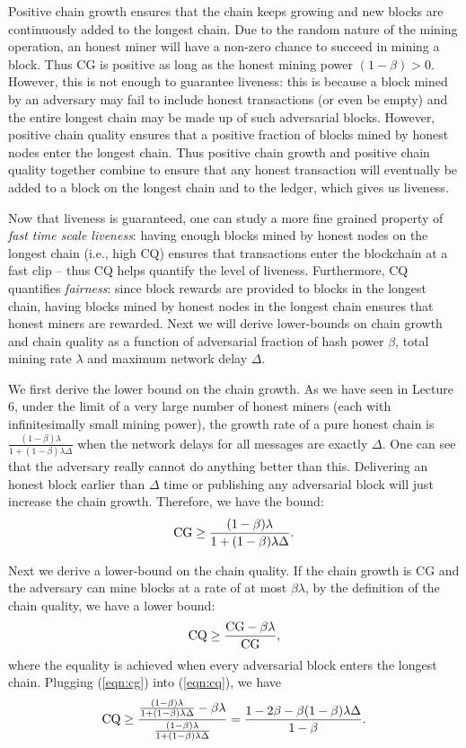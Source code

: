 \documentclass{article}
\begin{document}
Positive chain growth ensures that the chain keeps growing and new blocks are continuously added to the longest chain. Due to the random nature of the mining operation, an honest miner will have a non-zero chance to succeed in mining a block. Thus CG is  positive as long as the honest mining power $(1-\beta) > 0$. However, this is not enough to guarantee  liveness: this is because a block mined by an adversary   may fail to include honest transactions (or even be empty) and the entire longest chain may be made up of such adversarial blocks. However, positive chain quality ensures that a positive fraction of blocks mined by honest nodes enter the longest chain. Thus positive chain growth and positive chain quality together combine to  ensure that any honest transaction will eventually be added to a block on the longest chain and to the ledger, which gives us  liveness. 

Now that liveness is guaranteed, one can study a more fine grained property of {\em fast time scale liveness}: having enough blocks mined by honest nodes on the longest chain (i.e., high CQ) ensures that transactions enter the blockchain at a fast clip -- thus CQ helps quantify the level of liveness. Furthermore, CQ quantifies  {\em fairness}:  since block rewards are provided to blocks in the longest chain, having blocks mined by honest nodes in the longest chain ensures that honest miners are rewarded. Next we will derive lower-bounds on chain growth and chain quality as a function of  adversarial fraction of hash power $\beta$, total mining rate $\lambda$ and maximum network delay $\Delta$.

We first derive the lower bound on the chain growth. As we have seen in Lecture 6, under the limit of a very large number of honest miners (each with infinitesimally small mining power), the growth rate of a pure honest chain is $\frac{(1-\beta)\lambda}{1+(1-\beta)\lambda\Delta}$ when the network delays for all messages are exactly $\Delta$. One can see that the adversary really cannot do anything better than this. Delivering an honest block earlier than $\Delta$ time or publishing any adversarial block will just increase the chain growth. Therefore, we have the bound:
\begin{equation}
\label{eqn:cg}
    {\rm CG} \geq \frac{(1-\beta)\lambda}{1+(1-\beta)\lambda\Delta}.
\end{equation}

Next we derive a lower-bound on the chain quality. If the chain growth is CG and the adversary can mine blocks at a rate of at most $\beta \lambda$, by the definition of the chain quality, we have a lower bound:
\begin{equation}
\label{eqn:cq}
    {\rm CQ} \geq \frac{{\rm CG}-\beta \lambda}{{\rm CG}}, 
\end{equation}
where the equality is achieved when every adversarial block enters the longest chain. Plugging (\ref{eqn:cg}) into (\ref{eqn:cq}), we have
\begin{equation}
    {\rm CQ} \geq \frac{\frac{(1-\beta)\lambda}{1+(1-\beta)\lambda\Delta}-\beta \lambda}{\frac{(1-\beta)\lambda}{1+(1-\beta)\lambda\Delta}} = \frac{1-2\beta - \beta(1-\beta)\lambda\Delta}{1-\beta}.
\end{equation}
\end{document}
